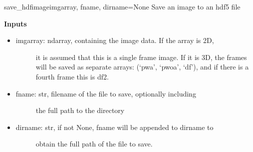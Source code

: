 \documentclass[letterpaper,10pt,english]{manual}
\begin{document}
\hypertarget{imageio.save_hdfimage}{}\begin{funcdesc}{save\_hdfimage}{imgarray, fname, dirname=None}
Save an image to an hdf5 file

\textbf{Inputs}
\begin{itemize}
\item {} \begin{description}
\item[imgarray: ndarray, containing the image data. If the array is 2D,]
it is assumed that this is a single frame image. If it is
3D, the frames will be saved as separate arrays:
(`pwa', `pwoa', `df'), and if there is a fourth frame this
is df2.

\end{description}

\item {} \begin{description}
\item[fname: str, filename of the file to save, optionally including]
the full path to the directory

\end{description}

\item {} \begin{description}
\item[dirname: str, if not None, fname will be appended to dirname to]
obtain the full path of the file to save.

\end{description}

\end{itemize}
\end{funcdesc}
\end{document}
